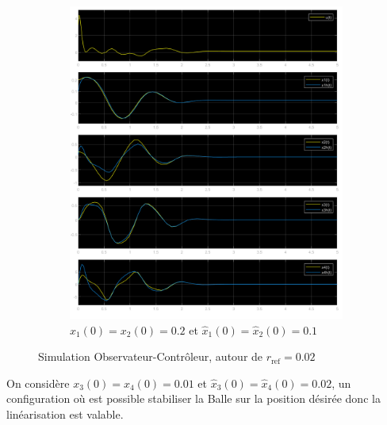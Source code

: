 \documentclass[class=article, crop=false]{standalone}
\begin{document}
\begin{resolution}
\begin{figure}[H]
\begin{subfigure}[b]{0.475\textwidth}
            \includegraphics[width=\textwidth]{../images/m5_r0.02_s0.2_o0.1.png}
            \caption{$x_1(0) = x_2(0) = 0.2$ et $\hat{x}_1(0) = \hat{x}_2(0) = 0.1$}
        \end{subfigure}
        \caption{Simulation Observateur-Contrôleur, autour de $r_{\text{ref}} = 0.02$}
    \end{figure}
    On considère $x_3(0) = x_4(0) = 0.01$ et $\hat{x}_3(0) = \hat{x}_4(0) = 0.02$, un configuration où est possible stabiliser la Balle sur la position désirée donc la linéarisation est valable.
\end{resolution}

\newpage
\end{document}
